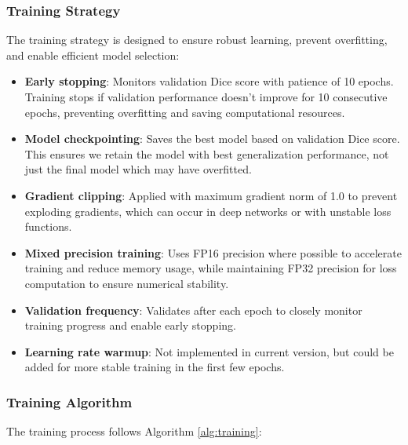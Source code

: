 \documentclass[12pt,a4paper]{article}
\begin{document}
\subsubsection{Training Strategy}

The training strategy is designed to ensure robust learning, prevent overfitting, and enable efficient model selection:

\begin{itemize}
    \item \textbf{Early stopping}: Monitors validation Dice score with patience of 10 epochs. Training stops if validation performance doesn't improve for 10 consecutive epochs, preventing overfitting and saving computational resources.
    \item \textbf{Model checkpointing}: Saves the best model based on validation Dice score. This ensures we retain the model with best generalization performance, not just the final model which may have overfitted.
    \item \textbf{Gradient clipping}: Applied with maximum gradient norm of 1.0 to prevent exploding gradients, which can occur in deep networks or with unstable loss functions.
    \item \textbf{Mixed precision training}: Uses FP16 precision where possible to accelerate training and reduce memory usage, while maintaining FP32 precision for loss computation to ensure numerical stability.
    \item \textbf{Validation frequency}: Validates after each epoch to closely monitor training progress and enable early stopping.
    \item \textbf{Learning rate warmup}: Not implemented in current version, but could be added for more stable training in the first few epochs.
\end{itemize}

\subsubsection{Training Algorithm}

The training process follows Algorithm \ref{alg:training}:
\end{document}
